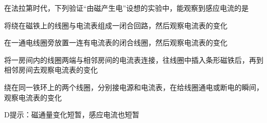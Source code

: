 在法拉第时代，下列验证“由磁产生电”设想的实验中，能观察到感应电流的是\paren[D]
\begin{choices}
	\item 将绕在磁铁上的线圈与电流表组成一闭合回路，然后观察电流表的变化
	\item 在一通电线圈旁放置一连有电流表的闭合线圈，然后观察电流表的变化
	\item 将一房间内的线圈两端与相邻房间的电流表连接，往线圈中插入条形磁铁后，再到相邻房间去观察电流表的变化
	\item 绕在同一铁环上的两个线圈，分别接电源和电流表，在给线圈通电或断电的瞬间，观察电流表的变化
\end{choices}
\begin{answer}
    D\qquad 提示：磁通量变化短暂，感应电流也短暂
\end{answer}
